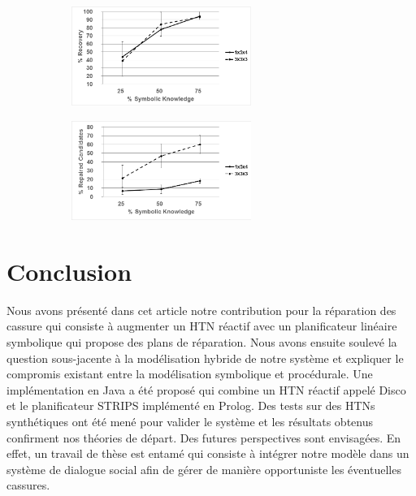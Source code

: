 \documentclass[a4paper,twoside,french]{article}
\begin{document}
		\begin{figure}[t]
			\centering
			\begin{subfigure}{2.3in}
				\centerline{\includegraphics[width=2.3in]{figs/recovery}}
				\vskip 8pt 
			\end{subfigure}
			\hfill
			\begin{subfigure}{2.3in}
				\centerline{\includegraphics[width=2.3in]{figs/candidates}}
				\vskip 8pt 
			\end{subfigure}
			\vskip 6pt
		\end{figure}
\section{Conclusion}
 Nous avons présenté dans cet article notre contribution pour la réparation des cassure qui consiste à augmenter un HTN réactif avec un planificateur linéaire symbolique qui propose des plans de réparation. Nous avons ensuite soulevé la question sous-jacente à la modélisation hybride de notre système et expliquer le compromis existant entre la modélisation symbolique et procédurale. Une implémentation en Java a été proposé qui combine un HTN réactif appelé Disco et le planificateur STRIPS implémenté en Prolog. Des tests sur des HTNs synthétiques ont été mené pour valider le système et les résultats obtenus confirment nos théories de départ.  Des futures perspectives sont envisagées. En effet, un travail de thèse est entamé qui consiste à intégrer notre modèle dans un système de dialogue social afin de gérer de manière opportuniste les éventuelles cassures.  
		\vskip 4pt
		
							
				
\end{document}

